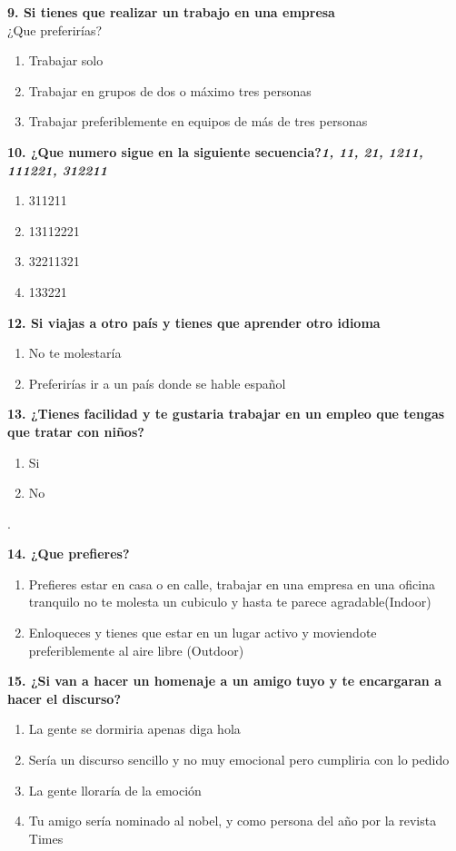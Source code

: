 \documentclass{article}
\begin{document}
\textbf{9. Si tienes que realizar un trabajo en una empresa }\\ 
¿Que preferirías?
\begin{enumerate}[label=(\Alph*)] 
\item Trabajar solo
\item Trabajar en grupos de dos o máximo tres personas
\item Trabajar preferiblemente en equipos de más de tres personas
 
\end{enumerate}

\textbf{10. ¿Que numero sigue en la siguiente secuencia?\emph{1, 11, 21, 1211, 111221, 312211} }
\begin{enumerate}[label=(\Alph*)] 
\item 311211
\item 13112221
\item 32211321
\item 133221
\end{enumerate}

\textbf{12. Si viajas a otro país y tienes que aprender otro idioma}
\begin{enumerate}[label=(\Alph*)] 
\item No te molestaría
\item Preferirías ir a un país donde se hable español
\end{enumerate}

\textbf{13. ¿Tienes facilidad y te gustaria trabajar en un empleo que tengas que tratar con niños?}
\begin{enumerate}[label=(\Alph*)]
\item Si
\item No 
\end{enumerate}.  

\textbf{14. ¿Que prefieres?}
\begin{enumerate}[label=(\Alph*)] 
\item Prefieres estar en casa o en calle, trabajar en una empresa en una oficina tranquilo no te molesta un cubiculo y hasta te parece agradable(Indoor)
\item Enloqueces y tienes que estar en un lugar activo y moviendote preferiblemente al aire libre (Outdoor)
\end{enumerate}
\pagebreak
\textbf{15. ¿Si van a hacer un homenaje a un amigo tuyo y te encargaran a hacer el discurso?}
\begin{enumerate}[label=(\Alph*)] 
\item La gente  se dormiria apenas diga hola
\item Sería un discurso sencillo y no muy emocional pero cumpliria con lo pedido
\item La gente lloraría de la emoción
\item Tu amigo sería nominado al nobel, y como persona del año por la revista Times
\end{enumerate}
\end{document}
